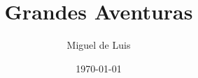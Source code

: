 \title{Grandes Aventuras}
\subject{Juego de Rol}
\author{Miguel de Luis}
\publishers{Pequeña Editorial Imaginaria}
\date{\today}
